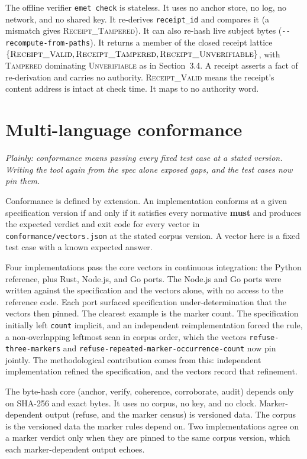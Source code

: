 \documentclass[11pt]{article}
\begin{document}
The offline verifier \texttt{emet check} is stateless. It uses no anchor store, no log, no network, and no shared key. It re-derives \texttt{receipt\_id} and compares it (a mismatch gives \textsc{Receipt\_Tampered}). It can also re-hash live subject bytes (\texttt{-{}-recompute-from-paths}). It returns a member of the closed receipt lattice $\{\textsc{Receipt\_Valid}, \textsc{Receipt\_Tampered}, \textsc{Receipt\_Unverifiable}\}$, with \textsc{Tampered} dominating \textsc{Unverifiable} as in Section~3.4. A receipt asserts a fact of re-derivation and carries no authority. \textsc{Receipt\_Valid} means the receipt's content address is intact at check time. It maps to no authority word.

\section{Multi-language conformance}
\label{sec:conformance}
\emph{Plainly: conformance means passing every fixed test case at a stated version. Writing the tool again from the spec alone exposed gaps, and the test cases now pin them.}

Conformance is defined by extension. An implementation conforms at a given specification version if and only if it satisfies every normative \textbf{must} and produces the expected verdict and exit code for every vector in \texttt{conformance/vectors.json} at the stated corpus version. A vector here is a fixed test case with a known expected answer.

Four implementations pass the core vectors in continuous integration: the Python reference, plus Rust, Node.js, and Go ports. The Node.js and Go ports were written against the specification and the vectors alone, with no access to the reference code. Each port surfaced specification under-determination that the vectors then pinned. The clearest example is the marker count. The specification initially left \texttt{count} implicit, and an independent reimplementation forced the rule, a non-overlapping leftmost scan in corpus order, which the vectors \texttt{refuse-three-markers} and \texttt{refuse-repeated-marker-occurrence-count} now pin jointly. The methodological contribution comes from this: independent implementation refined the specification, and the vectors record that refinement.

The byte-hash core (anchor, verify, coherence, corroborate, audit) depends only on SHA-256 and exact bytes. It uses no corpus, no key, and no clock. Marker-dependent output (refuse, and the marker census) is versioned data. The corpus is the versioned data the marker rules depend on. Two implementations agree on a marker verdict only when they are pinned to the same corpus version, which each marker-dependent output echoes.
\end{document}
